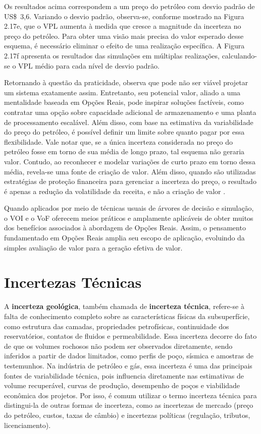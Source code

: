 Os resultados acima correspondem a um preço do petróleo com desvio padrão de US\$~3,6. Variando o desvio padrão, observa-se, conforme mostrado na Figura 2.17e, que o VPL aumenta à medida que cresce a magnitude da incerteza no preço do petróleo. Para obter uma visão mais precisa do valor esperado desse esquema, é necessário eliminar o efeito de uma realização específica. A Figura 2.17f apresenta os resultados das simulações em múltiplas realizações, calculando-se o VPL médio para cada nível de desvio padrão.

Retornando à questão da praticidade, \cite{16} observa que pode não ser viável projetar um sistema exatamente assim. Entretanto, seu potencial valor, aliado a uma mentalidade baseada em Opções Reais, pode inspirar soluções factíveis, como contratar uma opção sobre capacidade adicional de armazenamento e uma planta de processamento escalável. Além disso, com base na estimativa da variabilidade do preço do petróleo, é possível definir um limite sobre quanto pagar por essa flexibilidade. Vale notar que, se a única incerteza considerada no preço do petróleo fosse em torno de sua média de longo prazo, tal esquema não geraria valor. Contudo, ao reconhecer e modelar variações de curto prazo em torno dessa média, revela-se uma fonte de criação de valor. Além disso, quando são utilizadas estratégias de proteção financeira para gerenciar a incerteza do preço, o resultado é apenas a redução da volatilidade da receita, e não a criação de valor \cite{16}.

Quando aplicados por meio de técnicas usuais de árvores de decisão e simulação, o VOI e o VoF oferecem meios práticos e amplamente aplicáveis de obter muitos dos benefícios associados à abordagem de Opções Reais. Assim, o pensamento fundamentado em Opções Reais amplia seu escopo de aplicação, evoluindo da simples avaliação de valor para a geração efetiva de valor.

\section{Incertezas Técnicas}

A \textbf{incerteza geológica}, também chamada de \textbf{incerteza técnica}, refere-se à falta de conhecimento completo sobre as características físicas da subsuperfície, como estrutura das camadas, propriedades petrofísicas, continuidade dos reservatórios, contatos de fluidos e permeabilidade. Essa incerteza decorre do fato de que os volumes rochosos não podem ser observados diretamente, sendo inferidos a partir de dados limitados, como perfis de poço, sísmica e amostras de testemunhos. Na indústria de petróleo e gás, essa incerteza é uma das principais fontes de variabilidade técnica, pois influencia diretamente nas estimativas de volume recuperável, curvas de produção, desempenho de poços e viabilidade econômica dos projetos. Por isso, é comum utilizar o termo incerteza técnica para distingui-la de outras formas de incerteza, como as incertezas de mercado (preço do petróleo, custos, taxas de câmbio) e incertezas políticas (regulação, tributos, licenciamento).

